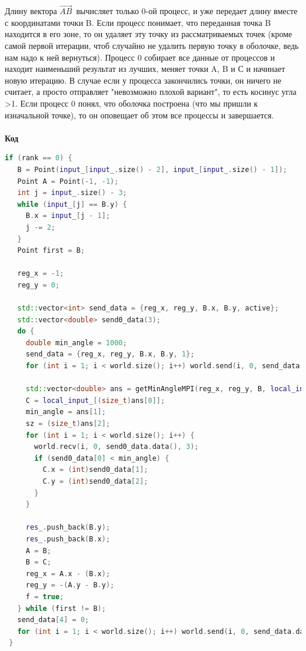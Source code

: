 \documentclass[a4paper]{article}
\begin{document}
Длину вектора \(\vec{AB}\)\ вычисляет только 0-ой процесс, и уже передает длину вместе с координатами точки B.
Если процесс понимает, что переданная точка B находится в его зоне, то он удаляет эту точку из рассматриваемых точек (кроме самой первой итерации, чтоб случайно не удалить первую точку в оболочке, ведь нам надо к ней вернуться).
Процесс 0 собирает все данные от процессов и находит наименьший результат из лучших, меняет точки A, B и С и начинает новую итерацию.
В случае если у процесса закончились точки, он ничего не считает, а просто отправляет "невозможно плохой вариант", то есть косинус угла >1. 
Если процесс 0 понял, что оболочка построена (что мы пришли к изначальной точке), то он оповещает об этом все процессы и завершается.\\\\

\textbf{Код}
\begin{lstlisting}[language=C++, caption=Распрараллеливание процесс 0:, label=lst:example]
 if (rank == 0) {
   B = Point(input_[input_.size() - 2], input_[input_.size() - 1]);
   Point A = Point(-1, -1);
   int j = input_.size() - 3;
   while (input_[j] == B.y) {
     B.x = input_[j - 1];
     j -= 2;
   }
   Point first = B;

   reg_x = -1;
   reg_y = 0;

   std::vector<int> send_data = {reg_x, reg_y, B.x, B.y, active};
   std::vector<double> send0_data(3);
   do {
     double min_angle = 1000;
     send_data = {reg_x, reg_y, B.x, B.y, 1};
     for (int i = 1; i < world.size(); i++) world.send(i, 0, send_data.data(), 5);
    
     std::vector<double> ans = getMinAngleMPI(reg_x, reg_y, B, local_input_, f);
     C = local_input_[(size_t)ans[0]];
     min_angle = ans[1];
     sz = (size_t)ans[2];
     for (int i = 1; i < world.size(); i++) {
       world.recv(i, 0, send0_data.data(), 3);
       if (send0_data[0] < min_angle) {
         C.x = (int)send0_data[1];
         C.y = (int)send0_data[2];
       }
     }

     res_.push_back(B.y);
     res_.push_back(B.x);
     A = B;
     B = C;
     reg_x = A.x - (B.x);
     reg_y = -(A.y - B.y); 
     f = true;
   } while (first != B);
   send_data[4] = 0;
   for (int i = 1; i < world.size(); i++) world.send(i, 0, send_data.data(), 5);
 }

\end{lstlisting}
\end{document}
